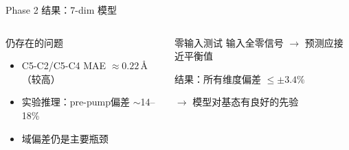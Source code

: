 \documentclass[aspectratio=169,9pt]{beamer}
\begin{document}
\begin{frame}{Phase 2 结果：7-dim 模型}
\begin{columns}[T]
    \begin{alertblock}{仍存在的问题}
      \scriptsize
      \begin{itemize}
        \item C5-C2/C5-C4 MAE $\approx 0.22$\,\AA（较高）
        \item 实验推理：pre-pump偏差 $\sim$14--18\%
        \item 域偏差仍是主要瓶颈
      \end{itemize}
    \end{alertblock}

    \begin{block}{零输入测试}
      \scriptsize
      输入全零信号 $\to$ 预测应接近平衡值

      结果：所有维度偏差 $\leq \pm 3.4\%$

      $\to$ 模型对基态有良好的先验
    \end{block}
  \end{columns}
\end{frame}
\end{document}
